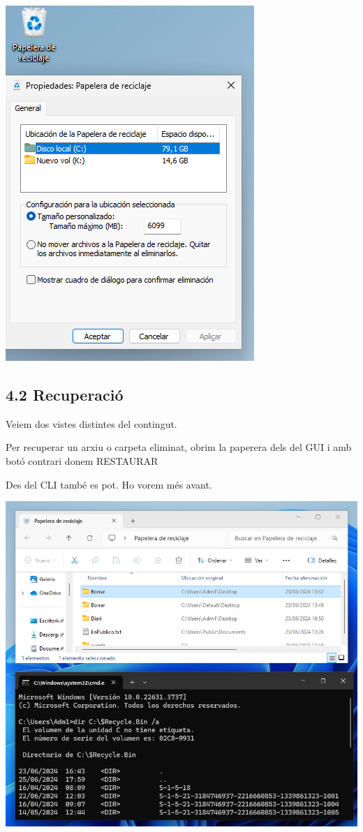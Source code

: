 \documentclass[
  a4paper,
]{article}
\begin{document}
\includegraphics{png/paperera.png}

\subsection{4.2 Recuperació}\label{recuperaciuxf3}

Veiem dos vistes distintes del contingut.

Per recuperar un arxiu o carpeta eliminat, obrim la paperera dels del
GUI i amb botó contrari donem RESTAURAR

Des del CLI també es pot. Ho vorem més avant.

\includegraphics{png/paperera1.png}
\end{document}
